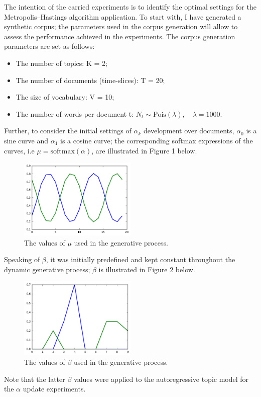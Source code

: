 \documentclass[12pt]{article}
\begin{document}
\par The intention of the carried experiments is to identify the optimal settings for the Metropolis--Hastings algorithm application. 
To start with, I have generated a synthetic corpus; the parameters used in the corpus generation will allow to assess the performance achieved in the experiments. The corpus generation parameters are set as follows:
\begin{itemize}
	\item The number of topics: K = 2;
	\item The number of documents (time-slices): T = 20;
	\item The size of vocabulary: V = 10;
	\item The number of words per document t: $N_t \sim \mbox{Pois}(\lambda),\quad \lambda = 1000$.
\end{itemize}
Further, to consider the initial settings of $\alpha_k$ development over documents, $\alpha_0$ is a sine curve and $\alpha_1$ is a cosine curve; the corresponding softmax expressions of the curves, i.e $\mu = \mbox{softmax}(\alpha)$, are illustrated in Figure 1 below.
\begin{figure}[H]
  \centering
  \includegraphics[width=0.5\textwidth]{alpha_initial}
  \caption{The values of $\mu$ used in the generative process.}
  \label{fig:mu}
\end{figure}
Speaking of $\beta$, it was initially predefined and kept constant throughout the dynamic generative process; $\beta$ is illustrated in Figure 2 below.
\begin{figure}[H]
  \centering
  \includegraphics[width=0.5\textwidth]{beta_initial}
  \caption{The values of $\beta$ used in the generative process.}
  \label{fig:beta}
\end{figure}
Note that the latter $\beta$ values were applied to the autoregressive topic model for the $\alpha$ update experiments.
\end{document}
